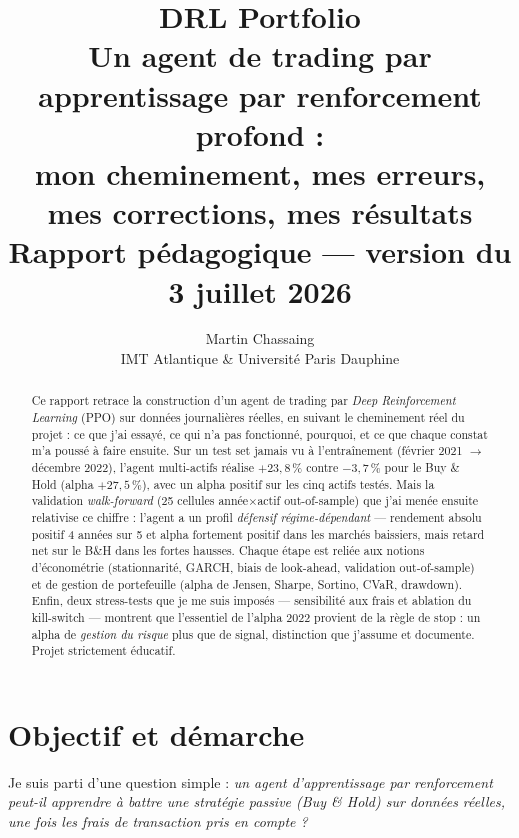\documentclass[11pt,a4paper]{article}
\title{\textbf{DRL Portfolio} \\[4pt]
\large Un agent de trading par apprentissage par renforcement profond : \\
mon cheminement, mes erreurs, mes corrections, mes résultats \\[6pt]
\normalsize Rapport pédagogique --- version du 3 juillet 2026}
\author{Martin Chassaing \\ \small IMT Atlantique \& Université Paris Dauphine}
\date{}
\begin{document}
\maketitle

\begin{abstract}
Ce rapport retrace la construction d'un agent de trading par \emph{Deep Reinforcement
Learning} (PPO) sur données journalières réelles, en suivant le cheminement réel du
projet : ce que j'ai essayé, ce qui n'a pas fonctionné, pourquoi, et ce que chaque
constat m'a poussé à faire ensuite. Sur un test set jamais vu à l'entraînement (février
2021 $\to$ décembre 2022), l'agent multi-actifs réalise $+23{,}8\,\%$ contre
$-3{,}7\,\%$ pour le Buy \& Hold (alpha $+27{,}5\,\%$), avec un alpha positif sur les
cinq actifs testés. Mais la validation \emph{walk-forward} (25 cellules année$\times$actif
out-of-sample) que j'ai menée ensuite relativise ce chiffre : l'agent a un profil
\emph{défensif régime-dépendant} --- rendement absolu positif 4 années sur 5 et alpha
fortement positif dans les marchés baissiers, mais retard net sur le B\&H dans les
fortes hausses. Chaque étape est reliée aux notions d'économétrie (stationnarité,
GARCH, biais de look-ahead, validation out-of-sample) et de gestion de portefeuille
(alpha de Jensen, Sharpe, Sortino, CVaR, drawdown). Enfin, deux stress-tests que je me
suis imposés --- sensibilité aux frais et ablation du kill-switch --- montrent que
l'essentiel de l'alpha 2022 provient de la règle de stop : un alpha de \emph{gestion du
risque} plus que de signal, distinction que j'assume et documente. Projet strictement
éducatif.
\end{abstract}

\tableofcontents
\vspace{1em}

\section{Objectif et démarche}

Je suis parti d'une question simple : \emph{un agent d'apprentissage par renforcement
peut-il apprendre à battre une stratégie passive (Buy \& Hold) sur données réelles, une
fois les frais de transaction pris en compte ?}
\end{document}
